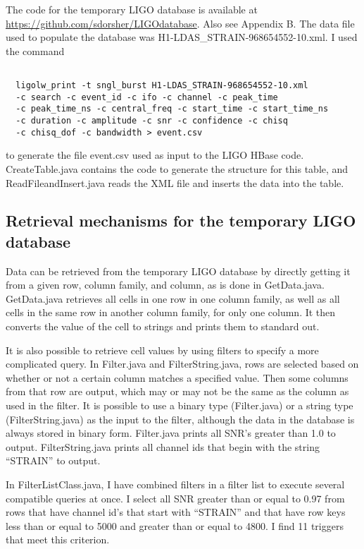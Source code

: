 \documentclass{article}
\begin{document}
The code for the temporary LIGO database is available at \url{https://github.com/sdorsher/LIGOdatabase}. Also see Appendix B. The data file used to populate the database was H1-LDAS\_STRAIN-968654552-10.xml. I used the command

\begin{lstlisting}

  ligolw_print -t sngl_burst H1-LDAS_STRAIN-968654552-10.xml
  -c search -c event_id -c ifo -c channel -c peak_time
  -c peak_time_ns -c central_freq -c start_time -c start_time_ns
  -c duration -c amplitude -c snr -c confidence -c chisq
  -c chisq_dof -c bandwidth > event.csv

\end{lstlisting}

to generate the file event.csv used as input to the LIGO HBase
code. CreateTable.java contains the code to generate the structure for
this table, and ReadFileandInsert.java reads the XML file and inserts
the data into the table. 

\subsection{Retrieval mechanisms for the temporary LIGO database}

Data can be retrieved from the temporary LIGO database by directly
getting it from a given row, column family, and column, as is done in
GetData.java. GetData.java retrieves all cells in one row in one
column family, as well as all cells in the same row in another column
family, for only one column. It then converts the value of the cell to
strings and prints them to standard out.

It is also possible to retrieve cell values by using filters to
specify a more complicated query. In Filter.java and
FilterString.java, rows are selected based on whether or not a certain
column matches a specified value. Then some columns from that row are
output, which may or may not be the same as the column as used in the
filter. It is possible to use a binary type (Filter.java) or a string
type (FilterString.java) as the input to the filter, although the data
in the database is always stored in binary form. Filter.java prints
all SNR's greater than 1.0 to output. FilterString.java prints all
channel ids that begin with the string ``STRAIN'' to output. 

In FilterListClass.java, I have combined filters in a filter list to
execute several compatible queries at once. I select all SNR greater
than or equal to 0.97 from rows that have channel id's that start with
``STRAIN'' and that have row keys less than or equal to 5000 and
greater than or equal to 4800. I find 11
triggers that meet this criterion.
\end{document}
